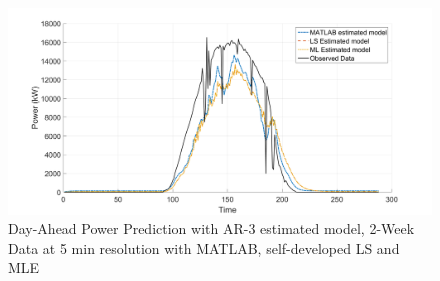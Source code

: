 \documentclass[journal]{IEEEtran}
\begin{document}
\begin{figure}[htpb]
	\centering
	\includegraphics[scale=0.2]{AR_methods_plot.png}
	\caption{Day-Ahead Power Prediction with AR-3 estimated model, 2-Week Data at 5 min resolution with MATLAB, self-developed LS and MLE}
	\label{fig16} %
\end{figure}
\end{document}
